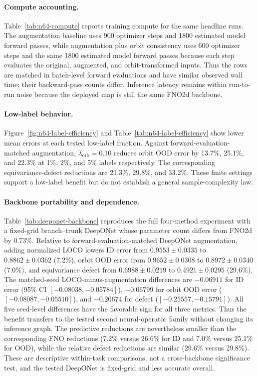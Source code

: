 \paragraph{Compute accounting.} Table~\ref{tab:n64-compute} reports training compute for the same headline runs. The augmentation baseline uses 900 optimizer steps and 1800 estimated model forward passes, while augmentation plus orbit consistency uses 600 optimizer steps and the same 1800 estimated model forward passes because each step evaluates the original, augmented, and orbit-transformed inputs. Thus the rows are matched in batch-level forward evaluations and have similar observed wall time; their backward-pass counts differ. Inference latency remains within run-to-run noise because the deployed map is still the same FNO2d backbone.

\paragraph{Low-label behavior.} Figure~\ref{fig:n64-label-efficiency} and Table~\ref{tab:n64-label-efficiency} show lower mean errors at each tested low-label fraction. Against forward-evaluation-matched augmentation, \(\lambda_{\mathrm{orb}}=0.10\) reduces orbit OOD error by 13.7\%, 25.1\%, and 22.3\% at 1\%, 2\%, and 5\% labels respectively. The corresponding equivariance-defect reductions are 21.3\%, 29.8\%, and 33.2\%. These finite settings support a low-label benefit but do not establish a general sample-complexity law.

\paragraph{Backbone portability and dependence.}
Table~\ref{tab:deeponet-backbone} reproduces the full four-method experiment with
a fixed-grid branch--trunk DeepONet whose parameter count differs from FNO2d by
0.73\%.  Relative to forward-evaluation-matched DeepONet augmentation, adding
normalized LOCO lowers ID error from \(0.9553\pm0.0335\) to
\(0.8862\pm0.0362\) (7.2\%), orbit OOD error from \(0.9652\pm0.0308\) to
\(0.8972\pm0.0340\) (7.0\%), and equivariance defect from
\(0.6988\pm0.0219\) to \(0.4921\pm0.0295\) (29.6\%).  The matched-seed
LOCO-minus-augmentation differences are \(-0.06911\) for ID error (95\% CI
\([-0.08038,-0.05784]\)), \(-0.06799\) for orbit OOD error
(\([-0.08087,-0.05510]\)), and \(-0.20674\) for defect
(\([-0.25557,-0.15791]\)).  All five seed-level differences have the favorable
sign for all three metrics.  Thus the benefit transfers to the tested second
neural-operator family without changing its inference graph.  The predictive
reductions are nevertheless smaller than the corresponding FNO reductions
(7.2\% versus 26.6\% for ID and 7.0\% versus 25.1\% for OOD), while the relative
defect reductions are similar (29.6\% versus 29.8\%).  These are descriptive
within-task comparisons, not a cross-backbone significance test, and the tested
DeepONet is fixed-grid and less accurate overall.

